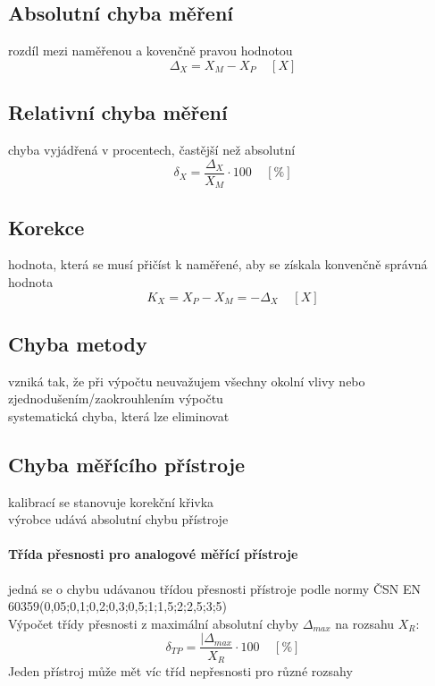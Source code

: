 \subsection*{Absolutní chyba měření}
rozdíl mezi naměřenou a kovenčně pravou hodnotou
\begin{equation}
    \Delta_X = X_M - X_P \;\;\;\; [X]
\end{equation}
\subsection*{Relativní chyba měření}
chyba vyjádřená v procentech, častější než absolutní
\begin{equation}
    \delta_X = \frac{\Delta_X}{X_M} \cdot 100\;\;\;\; [\%]
\end{equation}
\subsection*{Korekce}
hodnota, která se musí přičíst k naměřené, aby se získala konvenčně správná hodnota
\begin{equation}
    K_X = X_P - X_M = -\Delta_X \;\;\;\; [X]
\end{equation}
\subsection*{Chyba metody}
vzniká tak, že při výpočtu neuvažujem všechny okolní vlivy nebo zjednodušením/zaokrouhlením výpočtu\\
systematická chyba, která lze eliminovat
\subsection*{Chyba měřícího přístroje}
kalibrací se stanovuje korekční křivka\\
výrobce udává absolutní chybu přístroje\\
\paragraph*{Třída přesnosti pro analogové měřící přístroje}
jedná se o chybu udávanou třídou přesnosti přístroje podle normy ČSN EN 60359(0,05;0,1;0,2;0,3;0,5;1;1,5;2;2,5;3;5)\\
Výpočet třídy přesnosti z maximální absolutní chyby $\Delta_{max}$ na rozsahu $X_R$:
\begin{equation}
    \delta_{TP} = \frac{|\Delta_{max}}{X_R}\cdot 100 \;\;\;\; [\%]
\end{equation}
Jeden přístroj může mět víc tříd nepřesnosti pro různé rozsahy\\
